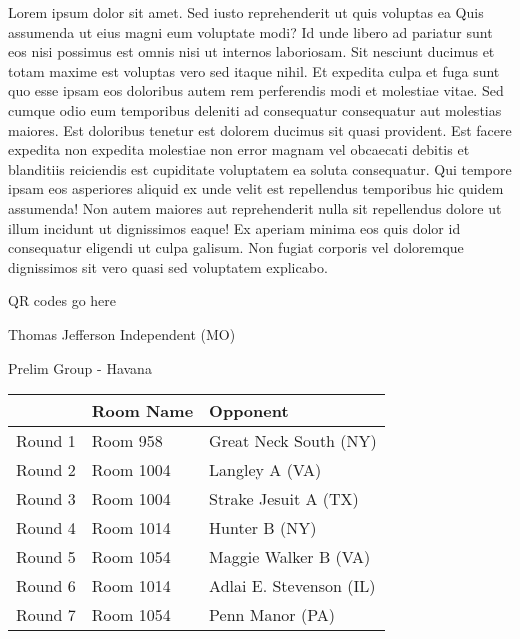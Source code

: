 \documentclass{article}%
\begin{document}
\vspace*{8pt}%
\linebreak%
\newline%
\newline%
Lorem ipsum dolor sit amet. Sed iusto reprehenderit ut quis voluptas ea Quis assumenda ut eius magni eum voluptate modi? Id unde libero ad pariatur sunt eos nisi possimus est omnis nisi ut internos laboriosam. Sit nesciunt ducimus et totam maxime est voluptas vero sed itaque nihil. Et expedita culpa et fuga sunt quo esse ipsam eos doloribus autem rem perferendis modi et molestiae vitae.\newline%
\newline%
Sed cumque odio eum temporibus deleniti ad consequatur consequatur aut molestias maiores. Est doloribus tenetur est dolorem ducimus sit quasi provident. Est facere expedita non expedita molestiae non error magnam vel obcaecati debitis et blanditiis reiciendis est cupiditate voluptatem ea soluta consequatur. Qui tempore ipsam eos asperiores aliquid ex unde velit est repellendus temporibus hic quidem assumenda!\newline%
\newline%
Non autem maiores aut reprehenderit nulla sit repellendus dolore ut illum incidunt ut dignissimos eaque! Ex aperiam minima eos quis dolor id consequatur eligendi ut culpa galisum. Non fugiat corporis vel doloremque dignissimos sit vero quasi sed voluptatem explicabo.\newline%
\newline%
%
\vspace*{30pt}%
\begin{center}%
\begin{Huge}%
QR codes go here%
\end{Huge}%
\end{center}%
\newpage%
%
\begin{center}%
\begin{Huge}%
Thomas Jefferson Independent (MO)%
\end{Huge}%
\vspace*{8pt}%
\linebreak%
\begin{Large}%
Prelim Group {-} Havana%
\end{Large}%
\end{center}%
\begin{tabularx}{\textwidth}{|c|Y|Y|}%
\hline%
&Room Name&Opponent\\%
\hline%
Round 1&Room 958&Great Neck South (NY)\\%
Round 2&Room 1004&Langley A (VA)\\%
Round 3&Room 1004&Strake Jesuit A (TX)\\%
Round 4&Room 1014&Hunter B (NY)\\%
Round 5&Room 1054&Maggie Walker B (VA)\\%
Round 6&Room 1014&Adlai E. Stevenson (IL)\\%
Round 7&Room 1054&Penn Manor (PA)\\%
\hline%
\end{tabularx}%
\end{document}
